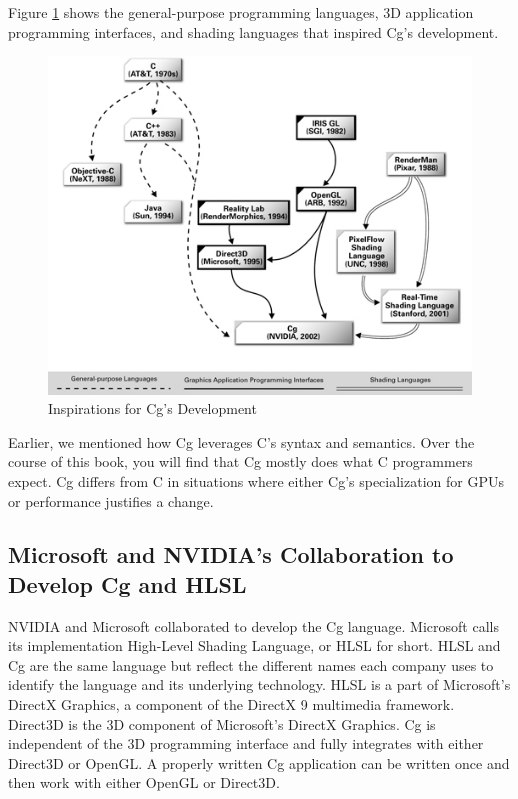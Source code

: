 \documentclass{book}
\begin{document}
Figure \ref{fig:1-11} shows the general-purpose programming languages, 3D application programming interfaces, and shading languages that inspired Cg's development.

\begin{figure}
    \centering
    \includegraphics[width=1\linewidth]{Images/fig1_11.jpg}
    \caption{Inspirations for Cg's Development}
    \label{fig:1-11}
\end{figure}

Earlier, we mentioned how Cg leverages C's syntax and semantics. Over the course of this book, you will find that Cg mostly does what C programmers expect. Cg differs from C in situations where either Cg's specialization for GPUs or performance justifies a change.

\subsection{Microsoft and NVIDIA's Collaboration to Develop Cg and HLSL}

NVIDIA and Microsoft collaborated to develop the Cg language. Microsoft calls its implementation High-Level Shading Language, or HLSL for short. HLSL and Cg are the same language but reflect the different names each company uses to identify the language and its underlying technology. HLSL is a part of Microsoft's DirectX Graphics, a component of the DirectX 9 multimedia framework. Direct3D is the 3D component of Microsoft's DirectX Graphics. Cg is independent of the 3D programming interface and fully integrates with either Direct3D or OpenGL. A properly written Cg application can be written once and then work with either OpenGL or Direct3D.
\end{document}
